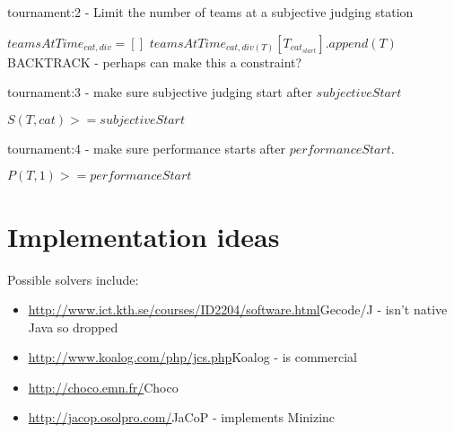 \documentclass[letterpaper,11pt]{report}
\begin{document}
\begin{algorithm}
\caption{tournament:2 - Limit the number of teams at a subjective judging station}
\begin{algorithmic}
    \STATE $teamsAtTime_{cat,div} = []$
  \ENDFOR
    \STATE $teamsAtTime_{cat,div(T)}[T_{cat_{start}}].append(T)$
  \ENDFOR
        \STATE BACKTRACK - perhaps can make this a constraint?
      \ENDIF
    \ENDFOR
  \ENDFOR
\ENDFOR
\end{algorithmic}
\end{algorithm}

\begin{algorithm}
\caption{tournament:3 - make sure subjective judging start after $subjectiveStart$}
\begin{algorithmic}
    \STATE $S(T, cat) >= subjectiveStart$
  \ENDFOR
\ENDFOR
\end{algorithmic}
\end{algorithm}

\begin{algorithm}
\caption{tournament:4 - make sure performance starts after
$performanceStart$.}
\begin{algorithmic}
  \STATE $P(T, 1) >= performanceStart$
\ENDFOR
\end{algorithmic}
\end{algorithm}

\FloatBarrier
\section{Implementation ideas}
Possible solvers include:
\begin{itemize}
\item \url{http://www.ict.kth.se/courses/ID2204/software.html}{Gecode/J} - isn't native Java so dropped
\item \url{http://www.koalog.com/php/jcs.php}{Koalog} - is commercial
\item \url{http://choco.emn.fr/}{Choco}
\item \url{http://jacop.osolpro.com/}{JaCoP} - implements Minizinc
\end{itemize}
\end{document}
